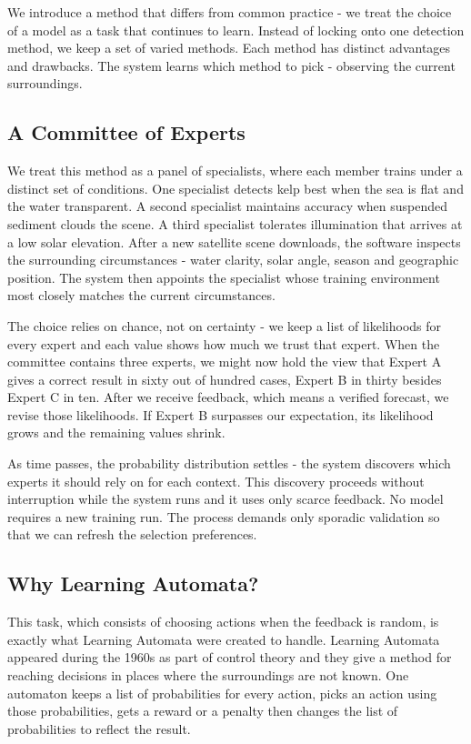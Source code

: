 \documentclass[11pt,a4paper]{article}
\begin{document}
We introduce a method that differs from common practice - we treat the choice of a model as a task that continues to learn. Instead of locking onto one detection method, we keep a set of varied methods. Each method has distinct advantages and drawbacks. The system learns which method to pick - observing the current surroundings.

\subsection{A Committee of Experts}

We treat this method as a panel of specialists, where each member trains under a distinct set of conditions. One specialist detects kelp best when the sea is flat and the water transparent. A second specialist maintains accuracy when suspended sediment clouds the scene. A third specialist tolerates illumination that arrives at a low solar elevation. After a new satellite scene downloads, the software inspects the surrounding circumstances - water clarity, solar angle, season and geographic position. The system then appoints the specialist whose training environment most closely matches the current circumstances.

The choice relies on chance, not on certainty - we keep a list of likelihoods for every expert and each value shows how much we trust that expert. When the committee contains three experts, we might now hold the view that Expert A gives a correct result in sixty out of hundred cases, Expert B in thirty besides Expert C in ten. After we receive feedback, which means a verified forecast, we revise those likelihoods. If Expert B surpasses our expectation, its likelihood grows and the remaining values shrink.

As time passes, the probability distribution settles - the system discovers which experts it should rely on for each context. This discovery proceeds without interruption while the system runs and it uses only scarce feedback. No model requires a new training run. The process demands only sporadic validation so that we can refresh the selection preferences.

\subsection{Why Learning Automata?}

This task, which consists of choosing actions when the feedback is random, is exactly what Learning Automata were created to handle. Learning Automata appeared during the 1960s as part of control theory and they give a method for reaching decisions in places where the surroundings are not known. One automaton keeps a list of probabilities for every action, picks an action using those probabilities, gets a reward or a penalty then changes the list of probabilities to reflect the result.
\end{document}
